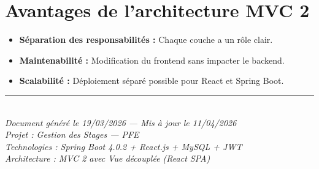 \documentclass[12pt,a4paper]{report}
\begin{document}
\section{Avantages de l'architecture MVC 2}

\begin{itemize}
    \item \textbf{Séparation des responsabilités :} Chaque couche a un rôle clair.
    \item \textbf{Maintenabilité :} Modification du frontend sans impacter le backend.
    \item \textbf{Scalabilité :} Déploiement séparé possible pour React et Spring Boot.
\end{itemize}

\vfill
\begin{center}
\rule{0.5\textwidth}{0.4pt}\\[6pt]
\textit{Document généré le 19/03/2026 --- Mis à jour le 11/04/2026}\\
\textit{Projet : Gestion des Stages --- PFE}\\
\textit{Technologies : Spring Boot 4.0.2 + React.js + MySQL + JWT}\\
\textit{Architecture : MVC 2 avec Vue découplée (React SPA)}
\end{center}
\end{document}
